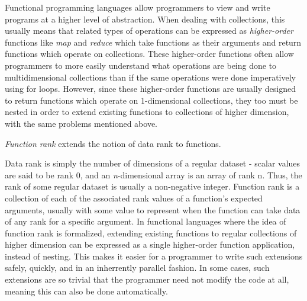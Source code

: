 Functional programming languages allow programmers to view and write programs at a higher level of abstraction.
When dealing with collections, this usually means that related types of operations can be expressed as \textit{higher-order} functions like \textit{map} and \textit{reduce} which take functions as their arguments and return functions which operate on collections.
These higher-order functions often allow programmers to more easily understand what operations are being done to multidimensional collections than if the same operations were done imperatively using for loops.
However, since these higher-order functions are usually designed to return functions which operate on 1-dimensional collections, they too must be nested in order to extend existing functions to collections of higher dimension, with the same problems mentioned above.

\textit{Function rank} extends the notion of data rank to functions.\begin{comment}TODO cite\end{comment}
Data rank is simply the number of dimensions of a regular dataset - scalar values are said to be rank 0, and an \textit{n}-dimensional array is an array of rank n.
Thus, the rank of some regular dataset is usually a non-negative integer.
Function rank is a collection of each of the associated rank values of a function's expected arguments, usually with some value to represent when the function can take data of any rank for a specific argument.
In functional languages where the idea of function rank is formalized, extending existing functions to regular collections of higher dimension can be expressed as a single higher-order function application, instead of nesting.
This makes it easier for a programmer to write such extensions safely, quickly, and in an inherrently parallel fashion.
In some cases, such extensions are so trivial that the programmer need not modify the code at all, meaning this can also be done automatically.

\nocite{rankanduni}
\nocite{dph}
\nocite{pc}
\nocite{opandfunc}

